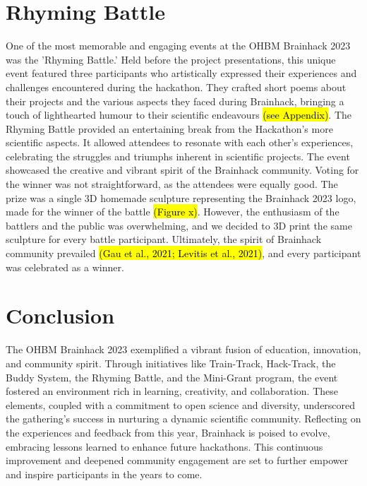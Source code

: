\documentclass{article}
\begin{document}
\section{Rhyming Battle}

One of the most memorable and engaging events at the OHBM Brainhack 2023 was the 'Rhyming Battle.'
Held before the project presentations, this unique event featured three participants who artistically expressed their experiences and challenges encountered during the hackathon.
They crafted short poems about their projects and the various aspects they faced during Brainhack, bringing a touch of lighthearted humour to their scientific endeavours \hl{(see Appendix)}.
The Rhyming Battle provided an entertaining break from the Hackathon's more scientific aspects.
It allowed attendees to resonate with each other's experiences, celebrating the struggles and triumphs inherent in scientific projects.
The event showcased the creative and vibrant spirit of the Brainhack community.
Voting for the winner was not straightforward, as the attendees were equally good.
The prize was a single 3D homemade sculpture representing the Brainhack 2023 logo, made for the winner of the battle \hl{(Figure x)}.
However, the enthusiasm of the battlers and the public was overwhelming, and we decided to 3D print the same sculpture for every battle participant.
Ultimately, the spirit of Brainhack community prevailed \cite{gau2021brainhack} \hl{(Gau et al., 2021; Levitis et al., 2021)}, and every participant was celebrated as a winner.

\section{Conclusion}

The OHBM Brainhack 2023 exemplified a vibrant fusion of education, innovation, and community spirit.
Through initiatives like Train-Track, Hack-Track, the Buddy System, the Rhyming Battle, and the Mini-Grant program, the event fostered an environment rich in learning, creativity, and collaboration.
These elements, coupled with a commitment to open science and diversity, underscored the gathering's success in nurturing a dynamic scientific community.
Reflecting on the experiences and feedback from this year, Brainhack is poised to evolve, embracing lessons learned to enhance future hackathons.
This continuous improvement and deepened community engagement are set to further empower and inspire participants in the years to come.



\end{document}
